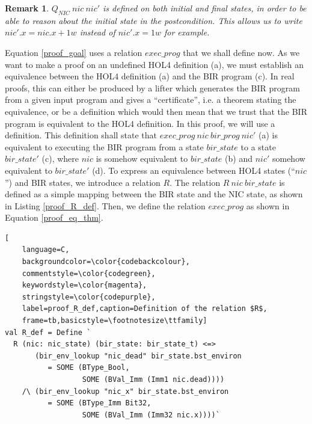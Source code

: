\documentclass{kththesis}
\newtheorem{remark}{Remark}
\begin{document}
{\begin{remark} \label{remark_Q_nic_intial_final}
$Q_{NIC}~nic~nic'$ is defined on both initial and final states, in order to be able to reason about the initial state in the postcondition. This allows us to write $nic'.x = nic.x + 1w$ instead of $nic'.x = 1w$ for example.
\end{remark}

Equation \ref{proof_goal} uses a relation $exec\_prog$ that we shall define now. As we want to make a proof on an undefined HOL4 definition (a), we must establish an equivalence between the HOL4 definition (a) and the BIR program (c). In real proofs, this can either be produced by a lifter which generates the BIR program from a given input program and gives a ``certificate'', i.e. a theorem stating the equivalence, or be a definition which would then mean that we trust that the BIR program is equivalent to the HOL4 definition. In this proof, we will use a definition. This definition shall state that $exec\_prog~nic~bir\_prog~nic'$ (a) is equivalent to executing the BIR program from a state $bir\_state$ to a state $bir\_state'$ (c), where $nic$ is somehow equivalent to $bir\_state$ (b) and $nic'$ somehow equivalent to $bir\_state'$ (d). To express an equivalence between HOL4 states (``$nic$'') and BIR states, we introduce a relation $R$. The relation $R~nic~bir\_state$ is defined as a simple mapping between the BIR state and the NIC state, as shown in Listing \ref{proof_R_def}. Then, we define the relation $exec\_prog$ as shown in Equation \ref{proof_eq_thm}\footnotemark.


\begin{lstlisting}[
    language=C,
    backgroundcolor=\color{codebackcolour},
    commentstyle=\color{codegreen},
    keywordstyle=\color{magenta},
    stringstyle=\color{codepurple},
    label=proof_R_def,caption=Definition of the relation $R$,
    frame=tb,basicstyle=\footnotesize\ttfamily]
val R_def = Define `
  R (nic: nic_state) (bir_state: bir_state_t) <=>
       (bir_env_lookup "nic_dead" bir_state.bst_environ
          = SOME (BType_Bool,
                  SOME (BVal_Imm (Imm1 nic.dead))))
    /\ (bir_env_lookup "nic_x" bir_state.bst_environ
          = SOME (BType_Imm Bit32,
                  SOME (BVal_Imm (Imm32 nic.x))))`
\end{lstlisting}

}
\end{document}

